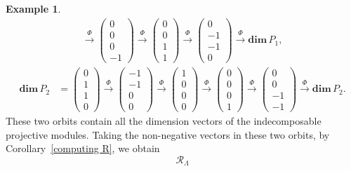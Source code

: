 \documentclass[11pt,a4paper]{amsart}
\theoremstyle{definition}
\newtheorem{example}[theorem]{Example}
\numberwithin{equation}{section}
\newcommand{\0}{\mathbf{0}}
\newcommand{\dimv}{\mathbf{dim}\,}
\begin{document}
\begin{example}
\[\begin{aligned}
			\xrightarrow{\Phi}
			\begin{pmatrix}0\\0\\0\\-1\end{pmatrix}
			\xrightarrow{\Phi}
			\begin{pmatrix}0\\0\\1\\1\end{pmatrix}
			\xrightarrow{\Phi}
			\begin{pmatrix}0\\-1\\-1\\0\end{pmatrix}
			\xrightarrow{\Phi}
			\dimv P_1,
		\end{aligned}
		\]
		\[
		\begin{aligned}
			\dimv P_2
			&=
			\begin{pmatrix}0\\1\\1\\0\end{pmatrix}
			\xrightarrow{\Phi}
			\begin{pmatrix}-1\\-1\\0\\0\end{pmatrix}
			\xrightarrow{\Phi}
			\begin{pmatrix}1\\0\\0\\0\end{pmatrix}
			\xrightarrow{\Phi}
			\begin{pmatrix}0\\0\\0\\1\end{pmatrix}
			\xrightarrow{\Phi}
			\begin{pmatrix}0\\0\\-1\\-1\end{pmatrix}
			\xrightarrow{\Phi}
			\dimv P_2.
		\end{aligned}
		\]		
		These two orbits contain all the dimension vectors of the
		indecomposable projective modules.  
		Taking the non-negative vectors in these two orbits, by  Corollary~\ref{computing R}, we obtain
		\[
		\mathcal R_{\Lambda}
\]
\end{example}
\end{document}
